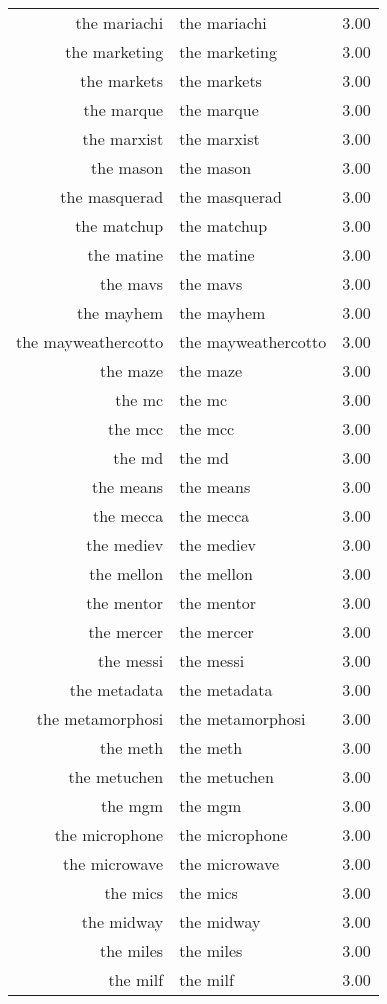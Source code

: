 \begin{table}[ht]
\begin{tabular}{rlr}
  the mariachi & the mariachi & 3.00 \\ 
  the marketing & the marketing & 3.00 \\ 
  the markets & the markets & 3.00 \\ 
  the marque & the marque & 3.00 \\ 
  the marxist & the marxist & 3.00 \\ 
  the mason & the mason & 3.00 \\ 
  the masquerad & the masquerad & 3.00 \\ 
  the matchup & the matchup & 3.00 \\ 
  the matine & the matine & 3.00 \\ 
  the mavs & the mavs & 3.00 \\ 
  the mayhem & the mayhem & 3.00 \\ 
  the mayweathercotto & the mayweathercotto & 3.00 \\ 
  the maze & the maze & 3.00 \\ 
  the mc & the mc & 3.00 \\ 
  the mcc & the mcc & 3.00 \\ 
  the md & the md & 3.00 \\ 
  the means & the means & 3.00 \\ 
  the mecca & the mecca & 3.00 \\ 
  the mediev & the mediev & 3.00 \\ 
  the mellon & the mellon & 3.00 \\ 
  the mentor & the mentor & 3.00 \\ 
  the mercer & the mercer & 3.00 \\ 
  the messi & the messi & 3.00 \\ 
  the metadata & the metadata & 3.00 \\ 
  the metamorphosi & the metamorphosi & 3.00 \\ 
  the meth & the meth & 3.00 \\ 
  the metuchen & the metuchen & 3.00 \\ 
  the mgm & the mgm & 3.00 \\ 
  the microphone & the microphone & 3.00 \\ 
  the microwave & the microwave & 3.00 \\ 
  the mics & the mics & 3.00 \\ 
  the midway & the midway & 3.00 \\ 
  the miles & the miles & 3.00 \\ 
  the milf & the milf & 3.00 \\ 

\end{tabular}
\end{table}
